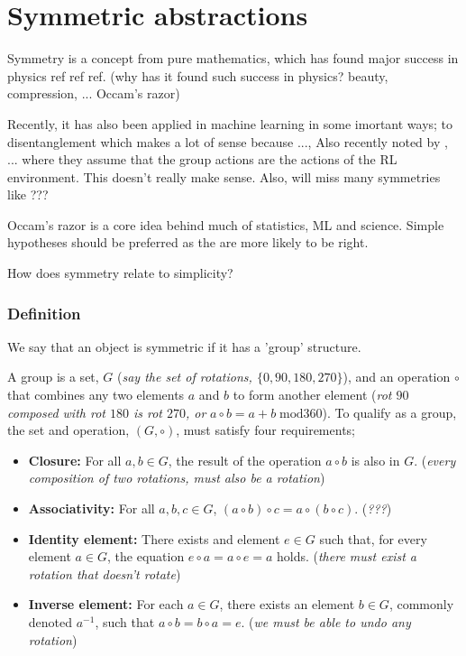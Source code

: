 \newpage
\section{Symmetric abstractions}\label{symmetric-abstractions}

Symmetry is a concept from pure mathematics, which has found major success in physics ref ref ref.
(why has it found such success in physics? beauty, compression, ... Occam's razor)

Recently, it has also been applied in machine learning in some imortant ways; to disentanglement \cite{Higgins2018} which makes a lot of sense because ...,
Also recently noted by \cite{Caselles-Dupre2019}, ... where they assume that
the group actions are the actions of the RL environment.
This doesn't really make sense. Also, will miss many symmetries like ???

Occam's razor is a core idea behind much of statistics, ML and science. Simple
hypotheses should be preferred as the are more likely to be right.

How does symmetry relate to simplicity?

\subsubsection{Definition}

We say that an object is symmetric if it has a 'group' structure.

A group is a set, $G$ (\textit{say the set of rotations, $\{0, 90, 180, 270\}$}),
and an operation $\circ$ that combines any two elements $a$ and $b$ to form
another element (\textit{rot $90$ composed with rot $180$ is rot $270$, or} $a \circ b = a + b \;\text{mod} 360$).
To qualify as a group, the set and operation, $(G, \circ)$, must satisfy four requirements;

\begin{itemize}
	\tightlist
	\item \textbf{Closure:} For all $a, b \in G$, the result of the operation $a \circ b$ is also in $G$. (\textit{every composition of two rotations, must also be a rotation})
	\item \textbf{Associativity:} For all $a,b,c \in G$, $(a\circ b) \circ c = a\circ (b\circ c)$. (\textit{???})
	\item \textbf{Identity element:} There exists and element $e\in G$ such that, for every element $a\in G$, the equation $e\circ a = a\circ e = a$ holds. (\textit{there must exist a rotation that doesn't rotate})
	\item \textbf{Inverse element:} For each $a \in G$, there exists an element $b \in G$, commonly denoted $a^{−1}$, such that $a \circ b = b \circ a = e$. (\textit{we must be able to undo any rotation})
\end{itemize}

